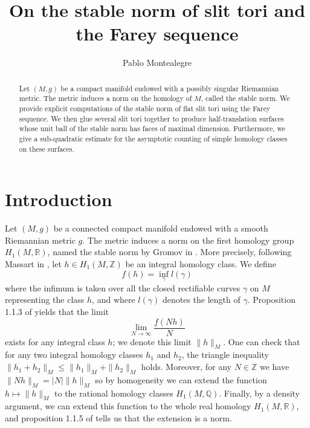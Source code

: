 \documentclass{article}
\newcommand{\QQ}{\mathbb{Q}}
\newcommand{\RR}{\mathbb{R}}
\newcommand{\ZZ}{\mathbb{Z}}
\newcommand{\Sts}[1]{\|#1\|_M}
\theoremstyle{definition}
\begin{document}
	
	\title{\bf On the stable norm of slit tori and the Farey sequence}
	\author{\sc Pablo Montealegre}
	\date{}
	
	\maketitle
	
	\begin{abstract}
		Let $(M,g)$ be a compact manifold endowed with a possibly singular Riemannian metric. The metric induces a norm on the homology of $M$, called the stable norm. We provide explicit computations of the stable norm of flat slit tori using the Farey sequence. We then glue several slit tori together to produce half-translation surfaces whose unit ball of the stable norm has faces of maximal dimension. Furthermore, we give a sub-quadratic estimate for the asymptotic counting of simple homology classes on these surfaces.
	\end{abstract}


\section*{Introduction}

Let $(M,g)$ be a connected compact manifold endowed with a smooth Riemannian metric $g$. The metric induces a norm on the first homology group $H_1(M,\RR)$, named the stable norm by Gromov in \cite{Gromov}. More precisely, following Massart in \cite{Mas}, let $h\in H_1(M,\ZZ)$ be an integral homology class. We define
	$$f(h) = \inf\limits_{\gamma} l(\gamma)$$
	where the infimum is taken over all the closed rectifiable curves $\gamma$ on $M$ representing the class $h$, and where $l(\gamma)$ denotes the length of $\gamma$. Proposition 1.1.3 of \cite{Mas} yields that the limit
	$$ \lim\limits_{N\to \infty} \frac{f(Nh)}{N} $$ 
	exists for any integral class $h$; we denote this limit $\Sts{h}$. One can check that for any two integral homology classes $h_1$ and $h_2$, the triangle inequality $\Sts{h_1+h_2} \le \Sts{h_1}+\Sts{h_2}$ holds. Moreover, for any $N\in\ZZ$ we have $\Sts{Nh}=|N|\Sts{h}$ so by homogeneity we can extend the function $h\mapsto \Sts{h}$ to the rational homology classes $H_1(M,\QQ)$. Finally, by a density argument, we can extend this function to the whole real homology $H_1(M,\RR)$, and proposition 1.1.5 of \cite{Mas} tells us that the extension is a norm. \newline \newline
	
	
\end{document}
